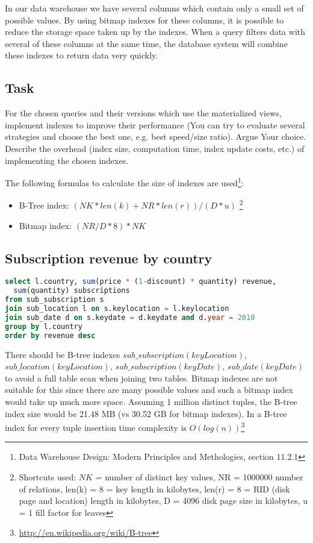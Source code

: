 In our data warehouse we have several columns which contain only a small set of possible values. By using bitmap indexes for these columns, it is possible to reduce the storage space taken up by the indexes. When a query filters data with several of these columns at the same time, the database system will combine these indexes to return data very quickly.


\subsection*{Task} 
For the chosen queries and their versions which use the materialized views,
implement indexes to improve their performance (You can try to evaluate
several strategies and choose the best one, e.g. best speed/size ratio).
Argue Your choice. Describe the overhead (index size, computation time,
index update costs, etc.) of implementing the chosen indexes.\newline

\noindent The following formulas to calculate the size of indexes are used\footnote{Data Warehouse Design: Modern Principles and Methologies, section 11.2.1}: 
\begin{itemize}
    \item B-Tree index: $(NK*len(k)+NR*len(r))/(D*u)$ \footnote{
Shortcuts used: $NK$ = number of distinct key values, NR = 1000000 number of relations, len(k) = 8 = key length in kilobytes, len(r) = 8 = RID (disk page and location) length in kilobytes, D = 4096 disk page size in kilobytes, u = 1 fill factor for leaves}
    \item Bitmap index: $(NR/D*8)*NK$
\end{itemize}

\subsection*{Subscription revenue by country} 
\begin{lstlisting}[language=sql]
select l.country, sum(price * (1-discount) * quantity) revenue, 
  sum(quantity) subscriptions 
from sub_subscription s 
join sub_location l on s.keylocation = l.keylocation 
join sub_date d on s.keydate = d.keydate and d.year = 2010
group by l.country 
order by revenue desc
\end{lstlisting}

There should be B-tree indexes $sub\_subscription(keyLocation)$, $sub\_location(keyLocation)$, $sub\_subscription(keyDate)$, $sub\_date(keyDate)$ to avoid a full table scan when joining two tables. 
Bitmap indexes are not suitable for this since there are many possible values and such a bitmap index would take up much more space. Assuming 1 million distinct tuples, the B-tree index size would be 21.48 MB (vs 30.52 GB for bitmap indexes). In a B-tree index for every tuple insertion time complexity is $O(log(n))$\footnote{\url{http://en.wikipedia.org/wiki/B-tree}}

